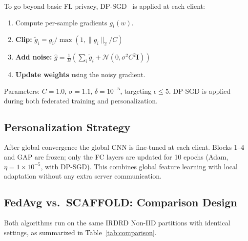 \documentclass[10pt, conference]{IEEEtran}
\begin{document}
To go beyond basic FL privacy, DP-SGD~\cite{r12} is applied at each client:
\begin{enumerate}[leftmargin=*, itemsep=1pt]
  \item Compute per-sample gradients $g_i(w)$.
  \item \textbf{Clip:} $\tilde{g}_i = g_i\big/\max\!\left(1,\|g_i\|_2/C\right)$
  \item \textbf{Add noise:} $\hat{g} = \tfrac{1}{B}\!\left(\sum_i\tilde{g}_i +
        \mathcal{N}(0,\sigma^2C^2\mathbf{I})\right)$
  \item \textbf{Update weights} using the noisy gradient.
\end{enumerate}
Parameters: $C=1.0$, $\sigma=1.1$, $\delta=10^{-5}$, targeting $\epsilon\leq5$.
DP-SGD is applied during both federated training and personalization.

\subsection{Personalization Strategy}

After global convergence the global CNN is fine-tuned at each client. Blocks
1--4 and GAP are frozen; only the FC layers are updated for 10 epochs (Adam,
$\eta=1\times10^{-5}$, with DP-SGD). This combines global feature learning with
local adaptation without any extra server communication.

\subsection{FedAvg vs.\ SCAFFOLD: Comparison Design}

Both algorithms run on the same IRDRD Non-IID partitions with identical
settings, as summarized in Table~\ref{tab:comparison}.
\end{document}
